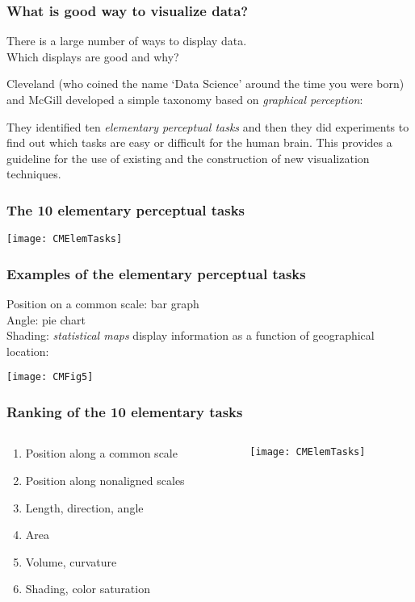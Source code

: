 \documentclass{beamer}
\begin{document}
\begin{frame}
\frametitle{What is good way to visualize data?}
There is a large number of ways to display data.\\
Which displays are good and why?
\medskip

Cleveland (who coined the name `Data Science' around the time you
were born) and McGill developed a simple taxonomy based on {\sl
graphical perception}: 
\medskip

They identified ten {\sl elementary perceptual
tasks} and then they did experiments to find out which tasks are easy or
difficult for the human brain. This provides a guideline for the
use of existing and the construction of new visualization techniques.
\end{frame}

\begin{frame}
\frametitle{The 10 elementary perceptual tasks}

\texttt{[image: CMElemTasks]}
\end{frame}

\begin{frame}
\frametitle{Examples of the elementary perceptual tasks}
Position on a common scale: bar graph\\
Angle: pie chart\\
Shading: {\sl statistical maps} display information as a function of
geographical location:

\texttt{[image: CMFig5]}
\end{frame}

\begin{frame}
\frametitle{Ranking of the 10 elementary tasks}
\begin{columns}[T]
\begin{column}{0.5\linewidth}
\begin{enumerate}
\item Position along a common scale
\item Position along nonaligned scales
\item Length, direction, angle
\item Area
\item Volume, curvature
\item Shading, color saturation
\end{enumerate}
\end{column}
\begin{column}{0.5\linewidth}
\texttt{[image: CMElemTasks]}
\end{column}
\end{columns}
\end{frame}
\end{document}
